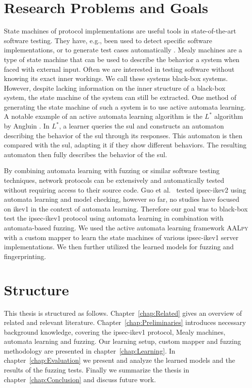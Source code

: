 \section{Research Problems and Goals}
State machines of protocol implementations are useful tools in state-of-the-art software testing. They have, e.g., been used to detect specific software implementations, or to generate test cases automatically \parencites{pferscher2021fingerprinting, pferscher2022fuzzing}. Mealy machines are a type of state machine that can be used to describe the behavior a system when faced with external input. Often we are interested in testing software without knowing its exact inner workings. We call these systems black-box systems. However, despite lacking information on the inner structure of a black-box system, the state machine of the system can still be extracted. One method of generating the state machine of such a system is to use active automata learning. A notable example of an active automata learning algorithm is the $L^*$ algorithm by Angluin \parencite{angluin1987learning}. In $L^*$, a learner queries the \ac{sul} and constructs an automaton describing the behavior of the \ac{sul} through its responses. This automaton is then compared with the \ac{sul}, adapting it if they show different behaviors. The resulting automaton then fully describes the behavior of the \ac{sul}.

By combining automata learning with fuzzing or similar software testing techniques, network protocols can be extensively and automatically tested without requiring access to their source code. Guo et al.~\parencite{guo2019model} tested \ac{ipsec}-\ac{ike}v2 using automata learning and model checking, however so far, no studies have focused on \ac{ike}v1 in the context of automata learning. Therefore our goal was to black-box test the \ac{ipsec}-\ac{ike}v1 protocol using automata learning in combination with automata-based fuzzing. We used the active automata learning framework \textsc{AALpy} \parencite{muvskardin2022aalpy} with a custom mapper to learn the state machines of various \ac{ipsec}-\ac{ike}v1 server implementations. We then further utilized the learned models for fuzzing and fingerprinting. %

\section{Structure}
This thesis is structured as follows. Chapter~\ref{chap:Related} gives an overview of related and relevant literature. Chapter~\ref{chap:Preliminaries} introduces necessary background knowledge, covering the \ac{ipsec}-\ac{ike}v1 protocol, Mealy machines, automata learning and fuzzing. Our learning setup, custom mapper and fuzzing methodology are presented in chapter~\ref{chap:Learning}. In chapter~\ref{chap:Evaluation} we present and analyze the learned models and the results of the fuzzing tests.
Finally we summarize the thesis in chapter~\ref{chap:Conclusion} and discuss future work.